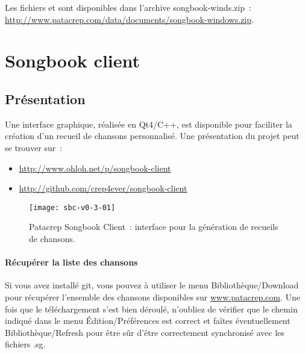 \documentclass[online]{patacrep}
\begin{document}
\begin{nota}
  Les fichiers  et  sont disponibles
  dans l'archive songbook-winds.zip~:
  \url{http://www.patacrep.com/data/documents/songbook-windows.zip}.
\end{nota}


\section{Songbook client}

\subsection{Présentation}

Une interface graphique, réalisée en Qt4/C++, est disponible pour
faciliter la création d'un recueil de chansons personnalisé. Une
présentation du projet peut se trouver sur~:
\begin{itemize}
\item \url{http://www.ohloh.net/p/songbook-client}
\item \url{http://github.com/crep4ever/songbook-client}
\end{itemize}

\begin{figure}[h]
  \centering
  \texttt{[image: sbc-v0-3-01]}
  \caption{Patacrep Songbook Client~: interface pour la génération de
    recueils de chansons.}
  \label{fig:sb-client}
\end{figure}

\paragraph{Récupérer la liste des chansons}
Si vous avez installé git, vous pouvez à utiliser le menu
Bibliothèque/Download pour récupérer l'ensemble des chansons
disponibles sur \url{www.patacrep.com}. Une fois que le téléchargement
s'est bien déroulé, n'oubliez de vérifier que le chemin indiqué dans
le menu Édition/Préférences est correct et faîtes éventuellement
Bibliothèque/Refresh pour être sûr d'être correctement synchronisé
avec les fichiers .sg.
\end{document}
